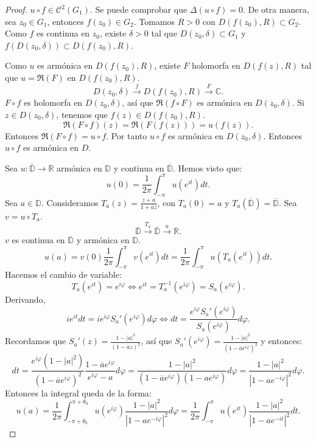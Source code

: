 \begin{proof}
    $u \circ f \in \mathcal{C}^2(G_1)$.
    Se puede comprobar que $\Delta(u \circ f) = 0$.
    De otra manera, sea $z_0 \in G_1$, entonces $f(z_0) \in G_2$.
    Tomamos $R > 0$ con $D(f(z_0), R) \subset G_2$.
    Como $f$ es continua en $z_0$, existe $\delta > 0$ tal que $D(z_0, \delta) \subset G_1$ y $f(D(z_0, \delta)) \subset D(f(z_0), R)$.

    Como $u$ es armónica en $D(f(z_0), R)$, existe $F$ holomorfa en $D(f(z), R)$ tal que $u = \Re(F)$ en $D(f(z_0), R)$.
    $$D(z_0, \delta) \xrightarrow{f} D(f(z_0), R) \xrightarrow{F} \mathbb{C}.$$
    $F \circ f$ es holomorfa en $D(z_0, \delta)$, así que $\Re(f \circ F)$ es armónica en $D(z_0, \delta)$.
    Si $z \in D(z_0, \delta)$, tenemos que $f(z) \in D(f(z_0), R)$.
    $$\Re(F \circ f)(z) = \Re(F(f(z))) = u(f(z)).$$
    Entonces $\Re(F \circ f) = u \circ f$.
    Por tanto $u \circ f$ es armónica en $D(z_0, \delta)$.
    Entonces $u \circ f$ es armónica en $D$.

    Sea $u: \overline{\mathbb{D}} \to \mathbb{R}$ armónica en $\mathbb{D}$ y continua en $\overline{\mathbb{D}}$.
    Hemos visto que:
    $$u(0) = \frac{1}{2\pi} \int_{-\pi}^\pi u(e^{it})dt.$$
    Sea $a \in \mathbb{D}$.
    Consideramos $T_a(z) = \frac{z+a}{1+\overline{a}z}$, con $T_a(0) = a$ y $T_a(\overline{\mathbb{D}}) = \overline{\mathbb{D}}$.
    Sea $v = u \circ T_a$.
    $$\overline{\mathbb{D}} \xrightarrow{T_a} \overline{\mathbb{D}} \xrightarrow{u} \mathbb{R}.$$
    $v$ es continua en $\overline{\mathbb{D}}$ y armónica en $\mathbb{D}$.
    $$u(a) = v(0) \frac{1}{2\pi} \int_{-\pi}^\pi v(e^{it})dt = \frac{1}{2\pi} \int_{-\pi}^\pi u(T_a(e^{it}))dt.$$
    Hacemos el cambio de variable:
    $$T_a(e^{it}) = e^{i\varphi} \Leftrightarrow e^{it} = T_a^{-1}(e^{i\varphi}) = S_a(e^{i\varphi}).$$
    Derivando,
    $$ie^{it}dt = ie^{i\varphi}S_a'(e^{i\varphi})d\varphi \Leftrightarrow dt = \frac{e^{i\varphi}S_a'(e^{i\varphi})}{S_a(e^{i\varphi})}d\varphi.$$
    Recordamos que $S_a'(z) = \frac{1-|a|^2}{(1-\overline{a}z)^2}$, así que $S_a'(e^{i\varphi}) = \frac{1-|a|^2}{(1-\overline{a}e^{i\varphi})^2}$ y entonces:
    $$dt = \frac{e^{i\varphi}(1-|a|^2)}{(1-\overline{a}e^{i\varphi})^2}\frac{1-\overline{a}e^{i\varphi}}{e^{i\varphi}-a}d\varphi = \frac{1-|a|^2}{(1-\overline{a}e^{i\varphi})(1-ae^{i\varphi})}d\varphi = \frac{1-|a|^2}{|1-ae^{-i\varphi}|^2}d\varphi.$$
    Entonces la integral queda de la forma:
    $$u(a) = \frac{1}{2\pi} \int_{-\pi + \theta_0}^{\pi + \theta_0} u(e^{i\varphi})\frac{1-|a|^2}{|1-ae^{-i\varphi}|^2}d\varphi = \frac{1}{2\pi} \int_{-\pi}^\pi u(e^{it})\frac{1-|a|^2}{|1-ae^{-it}|^2}dt.$$
\end{proof}

